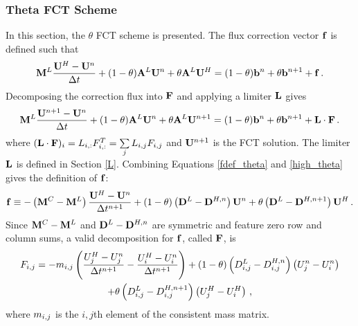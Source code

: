 \subsubsection{Theta FCT Scheme}
In this section, the $\theta$ FCT scheme is presented.
The flux correction vector $\mathbf{f}$ is defined such that
\begin{equation}\label{fdef_theta}
  \mathbf{M}^L\frac{\mathbf{U}^H-\mathbf{U}^n}{\Delta t}
  + (1-\theta)\mathbf{A}^L\mathbf{U}^n + \theta\mathbf{A}^L\mathbf{U}^H
  = (1-\theta)\mathbf{b}^n + \theta\mathbf{b}^{n+1} + \mathbf{f} \,.
\end{equation}
Decomposing the correction flux into $\mathbf{F}$ and applying a limiter $\mathbf{L}$ gives
\begin{equation}\label{limited_theta}
  \mathbf{M}^L\frac{\mathbf{U}^{n+1}-\mathbf{U}^n}{\Delta t}
  + (1-\theta)\mathbf{A}^L\mathbf{U}^n + \theta\mathbf{A}^L\mathbf{U}^{n+1}
  = (1-\theta)\mathbf{b}^n + \theta\mathbf{b}^{n+1} + \mathbf{L}\cdot\mathbf{F} \,.
\end{equation}
where $(\mathbf{L}\cdot\mathbf{F})_i = L_{i,:}F_{i,:}^T = \sum\limits_j L_{i,j} F_{i,j}$
and $\mathbf{U}^{n+1}$ is the FCT solution. The limiter $\mathbf{L}$ is
defined in Section \ref{L}.
Combining Equations \eqref{fdef_theta} and \eqref{high_theta}
gives the definition of $\mathbf{f}$:
\begin{equation}\label{f_theta}
   \mathbf{f} \equiv -\left(\mathbf{M}^C-\mathbf{M}^L\right)\frac{\mathbf{U}^H-\mathbf{U}^n}{\Delta t^{n+1}}
   + (1-\theta)\left(\mathbf{D}^L-\mathbf{D}^{H,n}\right)\mathbf{U}^n 
   + \theta    \left(\mathbf{D}^L-\mathbf{D}^{H,n+1}\right)\mathbf{U}^H \,.
\end{equation}
Since $\mathbf{M}^C-\mathbf{M}^L$ and $\mathbf{D}^L-\mathbf{D}^{H,n}$ are symmetric
and feature zero row and column sums, a valid decomposition for $\mathbf{f}$,
called $\mathbf{F}$, is
\begin{multline}
   F_{i,j} = -m_{i,j}\left(\frac{U_j^H - U_j^n}{\Delta t^{n+1}}
   - \frac{U_i^H - U_i^n}{\Delta t^{n+1}}\right)
   + (1-\theta)\left(D_{i,j}^L-D_{i,j}^{H,n}\right)  \left(U_j^n - U_i^n\right)\\
   + \theta    \left(D_{i,j}^L-D_{i,j}^{H,n+1}\right)\left(U_j^H - U_i^H\right) \,,
\end{multline}
where $m_{i,j}$ is the $i,j$th element of the consistent mass matrix.
%
